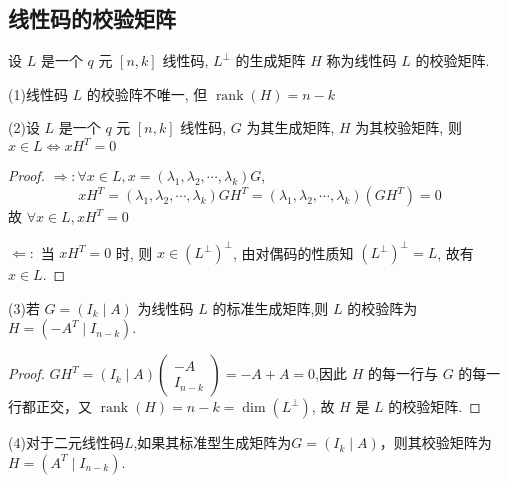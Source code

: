 \subsection{线性码的校验矩阵}
\begin{definition}
    设 $ L $ 是一个 $ q $ 元 $ [n, k] $ 线性码, $ L^{\perp} $ 的生成矩阵 $ H $ 称为线性码 $ L $ 的校验矩阵.
\end{definition}
\begin{remark}

    (1)线性码 $ L $ 的校验阵不唯一, 但 $ \operatorname{rank}(H)=n-k $
    
(2)设 $ L $ 是一个 $ q $ 元 $ [n, k] $ 线性码, $ G $ 为其生成矩阵, $ H $ 为其校验矩阵, 则 $ x \in L \Leftrightarrow x H^{T}=0 $
\begin{proof}
    $ \Rightarrow: \forall x \in L, x=\left(\lambda_{1}, \lambda_{2}, \cdots, \lambda_{k}\right) G $,
$$
x H^{T}=\left(\lambda_{1}, \lambda_{2}, \cdots, \lambda_{k}\right) G H^{T}=\left(\lambda_{1}, \lambda_{2}, \cdots, \lambda_{k}\right)\left(G H^{T}\right)=0
$$
故 $ \forall x \in L, x H^{T}=0 $

$ \Leftarrow: $ 当 $ x H^{T}=0 $ 时, 则 $ x \in\left(L^{\perp}\right)^{\perp} $, 由对偶码的性质知 $ \left(L^{\perp}\right)^{\perp}=L $, 故有 $ x \in L $.
\end{proof}

(3)若 $ G=\left(I_{k} \mid A\right) $ 为线性码 $ L $ 的标准生成矩阵,则 $ L $ 的校验阵为 $ H=\left(-A^{T} \mid I_{n-k}\right) $.

\begin{proof}
     $ G H^{T}=\left(I_{k} \mid A\right)\left(\begin{array}{c}-A \\ I_{n-k}\end{array}\right)=-A+A=0 $,因此 $ H $ 的每一行与 $ G $ 的每一行都正交，又 $ \operatorname{rank}(H)=n-k=\operatorname{dim}\left(L^{\perp}\right) $, 故 $ H $ 是 $ L $ 的校验矩阵.
\end{proof}

(4)对于二元线性码$L$,如果其标准型生成矩阵为$ G=\left(I_{k} \mid A\right) $，则其校验矩阵为$ H=\left(A^{T} \mid I_{n-k}\right) $.
\end{remark}


